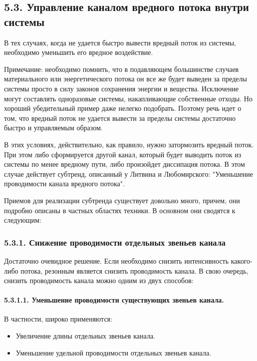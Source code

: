 \documentclass[a4paper,11pt]{article}
\begin{document}
\subsection{5.3. Управление каналом вредного потока внутри системы}

В тех случаях, когда не удается быстро вывести вредный поток из системы,
необходимо уменьшить его вредное воздействие.

Примечание: необходимо помнить, что в подавляющем большинстве случаев
материального или энергетического потока он все же будет выведен за пределы
системы просто в силу законов сохранения энергии и вещества. Исключение могут
составлять одноразовые системы, накапливающие собственные отходы.  Но хороший
убедительный пример даже нелегко подобрать. Поэтому речь идет о том, что
вредный поток не удается вывести за пределы системы достаточно быстро и
управляемым образом.

В этих условиях, действительно, как правило, нужно затормозить вредный поток.
При этом либо сформируется другой канал, который будет выводить поток из
системы по менее вредному пути, либо произойдет диссипация потока. В этом
случае действует субтренд, описанный у Литвина и Любомирского: "Уменьшение
проводимости канала вредного потока".

Приемов для реализации субтренда существует довольно много, причем, они
подробно описаны в частных областях техники. В основном они сводятся к
следующим:

\subsubsection{5.3.1.  Снижение проводимости отдельных звеньев канала}

Достаточно очевидное решение. Если необходимо снизить интенсивность
какого-либо потока, резонным является снизить проводимость канала. В свою
очередь, снизить проводимость канала можно одним из двух способов:

\paragraph{5.3.1.1.  Уменьшение проводимости существующих звеньев канала.} 

В частности, широко применяются:
\begin{itemize}
\item Увеличение длины отдельных звеньев канала.
\item Уменьшение удельной проводимости отдельных звеньев канала.
\end{itemize}
\end{document}

